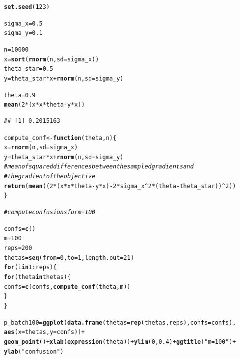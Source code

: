 \documentclass[a4paper]{article}
\makeatletter
\newcommand{\hlnum}[1]{\textcolor[rgb]{0.686,0.059,0.569}{#1}}%
\newcommand{\hlstr}[1]{\textcolor[rgb]{0.192,0.494,0.8}{#1}}%
\newcommand{\hlcom}[1]{\textcolor[rgb]{0.678,0.584,0.686}{\textit{#1}}}%
\newcommand{\hlopt}[1]{\textcolor[rgb]{0,0,0}{#1}}%
\newcommand{\hlstd}[1]{\textcolor[rgb]{0.345,0.345,0.345}{#1}}%
\newcommand{\hlkwa}[1]{\textcolor[rgb]{0.161,0.373,0.58}{\textbf{#1}}}%
\newcommand{\hlkwb}[1]{\textcolor[rgb]{0.69,0.353,0.396}{#1}}%
\newcommand{\hlkwc}[1]{\textcolor[rgb]{0.333,0.667,0.333}{#1}}%
\newcommand{\hlkwd}[1]{\textcolor[rgb]{0.737,0.353,0.396}{\textbf{#1}}}%
\newenvironment{kframe}{%
 \def\at@end@of@kframe{}%
 \ifinner\ifhmode%
  \def\at@end@of@kframe{\end{minipage}}%
  \begin{minipage}{\columnwidth}%
 \fi\fi%
 \def\FrameCommand##1{\hskip\@totalleftmargin \hskip-\fboxsep
 \colorbox{shadecolor}{##1}\hskip-\fboxsep
     \hskip-\linewidth \hskip-\@totalleftmargin \hskip\columnwidth}%
 \MakeFramed {\advance\hsize-\width
   \@totalleftmargin\z@ \linewidth\hsize
   \@setminipage}}%
 {\par\unskip\endMakeFramed%
 \at@end@of@kframe}
\newenvironment{knitrout}{}{} %
\makeatother
\begin{document}
{\begin{enumerate}
\begin{knitrout}
\begin{kframe}
\begin{alltt}
\hlkwd{set.seed}\hlstd{(}\hlnum{123}\hlstd{)}

\hlstd{sigma_x} \hlkwb{=} \hlnum{0.5}
\hlstd{sigma_y} \hlkwb{=} \hlnum{0.1}

\hlstd{n} \hlkwb{=} \hlnum{10000}
\hlstd{x} \hlkwb{=} \hlkwd{sort}\hlstd{(}\hlkwd{rnorm}\hlstd{(n,} \hlkwc{sd} \hlstd{= sigma_x))}
\hlstd{theta_star} \hlkwb{=} \hlnum{0.5}
\hlstd{y} \hlkwb{=} \hlstd{theta_star} \hlopt{*} \hlstd{x} \hlopt{+} \hlkwd{rnorm}\hlstd{(n,} \hlkwc{sd} \hlstd{= sigma_y)}

\hlstd{theta} \hlkwb{=} \hlnum{0.9}
\hlkwd{mean}\hlstd{(}\hlnum{2}\hlopt{*}\hlstd{(x}\hlopt{*}\hlstd{x}\hlopt{*}\hlstd{theta} \hlopt{-} \hlstd{y}\hlopt{*}\hlstd{x))}
\end{alltt}
\begin{verbatim}
## [1] 0.2015163
\end{verbatim}
\begin{alltt}
\hlstd{compute_conf} \hlkwb{<-} \hlkwa{function}\hlstd{(}\hlkwc{theta}\hlstd{,} \hlkwc{n}\hlstd{)\{}
  \hlstd{x} \hlkwb{=} \hlkwd{rnorm}\hlstd{(n,} \hlkwc{sd} \hlstd{= sigma_x)}
  \hlstd{y} \hlkwb{=} \hlstd{theta_star} \hlopt{*} \hlstd{x} \hlopt{+} \hlkwd{rnorm}\hlstd{(n,} \hlkwc{sd} \hlstd{= sigma_y)}
  \hlcom{# mean of squared differences between the sampled gradients and }
  \hlcom{# the gradient of the objective}
  \hlkwd{return}\hlstd{(}\hlkwd{mean}\hlstd{((}\hlnum{2}\hlopt{*}\hlstd{(x}\hlopt{*}\hlstd{x}\hlopt{*}\hlstd{theta} \hlopt{-} \hlstd{y}\hlopt{*}\hlstd{x)} \hlopt{-} \hlnum{2}\hlopt{*}\hlstd{sigma_x}\hlopt{^}\hlnum{2}\hlopt{*}\hlstd{(theta} \hlopt{-} \hlstd{theta_star))}\hlopt{^}\hlnum{2}\hlstd{))}
\hlstd{\}}

\hlcom{# compute confusions for m = 100}

\hlstd{confs} \hlkwb{=} \hlkwd{c}\hlstd{()}
\hlstd{m} \hlkwb{=} \hlnum{100}
\hlstd{reps} \hlkwb{=} \hlnum{200}
\hlstd{thetas} \hlkwb{=} \hlkwd{seq}\hlstd{(}\hlkwc{from}\hlstd{=}\hlnum{0}\hlstd{,} \hlkwc{to}\hlstd{=}\hlnum{1}\hlstd{,} \hlkwc{length.out} \hlstd{=} \hlnum{21}\hlstd{)}
\hlkwa{for}\hlstd{(i} \hlkwa{in} \hlnum{1}\hlopt{:}\hlstd{reps)\{}
  \hlkwa{for}\hlstd{(theta} \hlkwa{in} \hlstd{thetas)\{}
    \hlstd{confs} \hlkwb{=} \hlkwd{c}\hlstd{(confs,} \hlkwd{compute_conf}\hlstd{(theta, m))}
  \hlstd{\}}
\hlstd{\}}

\hlstd{p_batch100} \hlkwb{=} \hlkwd{ggplot}\hlstd{(}\hlkwd{data.frame}\hlstd{(}\hlkwc{thetas} \hlstd{=} \hlkwd{rep}\hlstd{(thetas, reps),} \hlkwc{confs} \hlstd{= confs),}
                    \hlkwd{aes}\hlstd{(}\hlkwc{x} \hlstd{= thetas,} \hlkwc{y} \hlstd{= confs))} \hlopt{+}
  \hlkwd{geom_point}\hlstd{()} \hlopt{+} \hlkwd{xlab}\hlstd{(}\hlkwd{expression}\hlstd{(theta))} \hlopt{+} \hlkwd{ylim}\hlstd{(}\hlnum{0}\hlstd{,} \hlnum{0.4}\hlstd{)} \hlopt{+} \hlkwd{ggtitle}\hlstd{(}\hlstr{"m = 100"}\hlstd{)} \hlopt{+}
  \hlkwd{ylab}\hlstd{(}\hlstr{"confusion"}\hlstd{)}


\end{alltt}
\end{kframe}
\end{knitrout}
\end{enumerate}}
\end{document}
